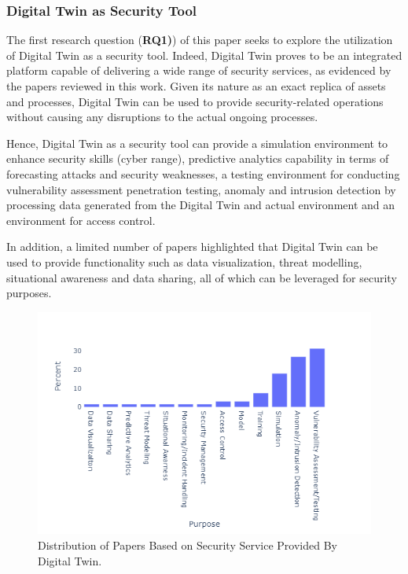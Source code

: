 \subsubsection*{Digital Twin as Security Tool}

The first research question (\textbf{RQ1)}) of this paper seeks to explore the utilization of Digital Twin as a security tool. Indeed, Digital Twin proves to be an integrated platform capable of delivering a wide range of security services, as evidenced by the papers reviewed in this work. Given its nature as an exact replica of assets and processes, Digital Twin can be used to provide security-related operations without causing any disruptions to the actual ongoing processes.

Hence, Digital Twin as a security tool can provide a simulation environment to enhance security skills (cyber range), predictive analytics capability in terms of forecasting attacks and security weaknesses, a testing environment for conducting vulnerability assessment penetration testing, anomaly and intrusion detection by processing data generated from the Digital Twin and actual environment and an environment for access control. 

In addition, a limited number of papers highlighted that Digital Twin can be used to provide functionality such as data visualization, threat modelling, situational awareness and data sharing, all of which can be leveraged for security purposes. 


\begin{figure}[H]    
    {
        \centering
        \includegraphics[width=1\textwidth]{images/rt/dt-securityservice.png}
        \caption{Distribution of Papers Based on Security Service Provided By Digital Twin.}
        \label{fig:use}
    }
\end{figure}

